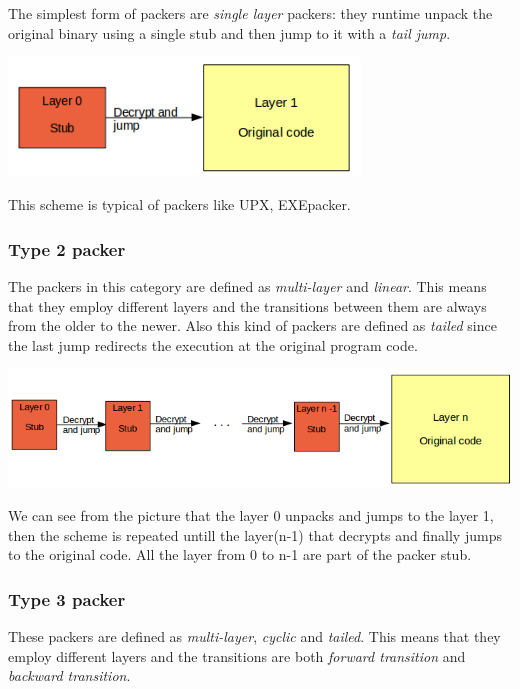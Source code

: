 The simplest form of packers are \textit{single layer} packers: they runtime unpack the original binary using a single stub and then jump to it with a \textit{tail jump}. 

\includegraphics[width=0.7\textwidth]{pictures/packer_type_1.png} 

This scheme is typical of packers like UPX, EXEpacker.

\subsubsection{Type 2 packer}

The packers in this category are defined as \textit{multi-layer} and \textit{linear}. This means that they employ different layers and the transitions between them are always from the older to the newer. Also this kind of packers are defined as \textit{tailed} since the last jump redirects the execution at the original program code.

\includegraphics[width=1\textwidth]{pictures/packer_type_2.png}

We can see from the picture that the layer 0 unpacks and jumps to the layer 1, then the scheme is repeated untill the layer(n-1) that decrypts and finally jumps to the original code. All the layer from 0 to n-1 are part of the packer stub.

\subsubsection{Type 3 packer}

These packers are defined as \textit{multi-layer}, \textit{cyclic} and \textit{tailed}. This means that they employ different layers and the transitions are both \textit{forward transition} and \textit{backward transition}.  

